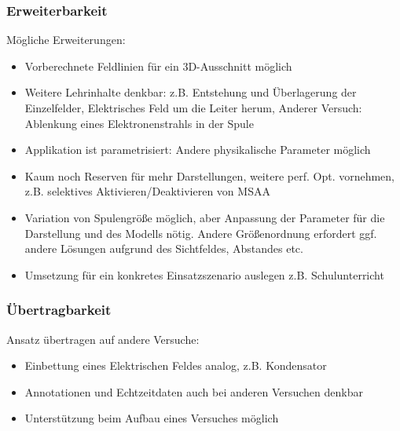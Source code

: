 \subsubsection{Erweiterbarkeit}
Mögliche Erweiterungen:
\begin{itemize}
	\item Vorberechnete Feldlinien für ein 3D-Ausschnitt möglich
	\item Weitere Lehrinhalte denkbar: z.B. Entstehung und Überlagerung der Einzelfelder, Elektrisches Feld um die Leiter herum, Anderer Versuch: Ablenkung eines Elektronenstrahls in der Spule
	\item Applikation ist parametrisiert: Andere physikalische Parameter möglich
	\item Kaum noch Reserven für mehr Darstellungen, weitere perf. Opt. vornehmen, z.B. selektives Aktivieren/Deaktivieren von MSAA
	\item Variation von Spulengröße möglich, aber Anpassung der Parameter für die Darstellung und des Modells nötig. Andere Größenordnung erfordert ggf. andere Lösungen aufgrund des Sichtfeldes, Abstandes etc.
	\item Umsetzung für ein konkretes Einsatzszenario auslegen z.B. Schulunterricht
\end{itemize}

\subsubsection{Übertragbarkeit}
Ansatz übertragen auf andere Versuche:
\begin{itemize}
	\item Einbettung eines Elektrischen Feldes analog, z.B. Kondensator
	\item Annotationen und Echtzeitdaten auch bei anderen Versuchen denkbar
	\item Unterstützung beim Aufbau eines Versuches möglich
\end{itemize}
	
	
	
	
	
	
	
	
	
	
	
	
	
	